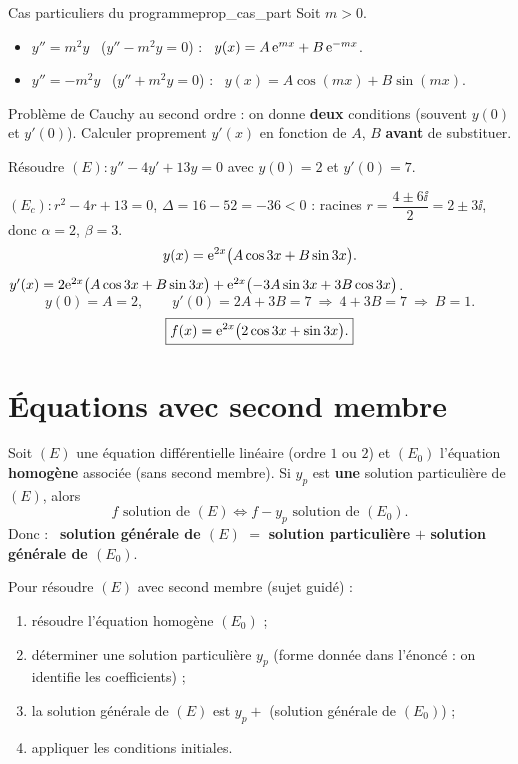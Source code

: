 \begin{propriete}{Cas particuliers du programme}{prop_cas_part}
	Soit $m>0$.
	\begin{itemize}[label=\textbullet]
		\item $y''=m^{2}y$ \ ($y''-m^{2}y=0$) : \
		$y(x)=A\,\mathrm{e}^{mx}+B\,\mathrm{e}^{-mx}$.
		\item $y''=-m^{2}y$ \ ($y''+m^{2}y=0$) : \
		$y(x)=A\cos(mx)+B\sin(mx)$.
	\end{itemize}
\end{propriete}

\begin{astucebac}
	Problème de Cauchy au second ordre : on donne \textbf{deux} conditions
	(souvent $y(0)$ et $y'(0)$). Calculer proprement $y'(x)$ en fonction de
	$A$, $B$ \textbf{avant} de substituer.
\end{astucebac}

\exerciceresolu
Résoudre $(E):y''-4y'+13y=0$ avec $y(0)=2$ et $y'(0)=7$.

\solution

$(E_c):r^{2}-4r+13=0$, $\Delta=16-52=-36<0$ : racines
$r=\dfrac{4\pm 6\ii}{2}=2\pm 3\ii$, donc $\alpha=2$, $\beta=3$.
\[
y(x)=\mathrm{e}^{2x}\bigl(A\cos 3x+B\sin 3x\bigr).
\]
$y'(x)=2\mathrm{e}^{2x}\bigl(A\cos 3x+B\sin 3x\bigr)
+\mathrm{e}^{2x}\bigl(-3A\sin 3x+3B\cos 3x\bigr)$.
\[
y(0)=A=2,\qquad y'(0)=2A+3B=7\ \Rightarrow\ 4+3B=7\ \Rightarrow\ B=1.
\]
\[
\boxed{f(x)=\mathrm{e}^{2x}\bigl(2\cos 3x+\sin 3x\bigr).}
\]


\section{Équations avec second membre}

\begin{theoreme}
	Soit $(E)$ une équation différentielle linéaire (ordre $1$ ou $2$) et
	$(E_0)$ l'équation \textbf{homogène} associée (sans second membre).
	Si $y_p$ est \textbf{une} solution particulière de $(E)$, alors
	\[
	f \text{ solution de } (E)
	\iff f-y_p \text{ solution de } (E_0).
	\]
	Donc : \ \textbf{solution générale de $(E)$} $=$ \textbf{solution
	particulière} $+$ \textbf{solution générale de $(E_0)$}.
\end{theoreme}

\begin{methode}
	Pour résoudre $(E)$ avec second membre (sujet guidé) :
	\begin{enumerate}
		\item résoudre l'équation homogène $(E_0)$ ;
		\item déterminer une solution particulière $y_p$ (forme donnée dans
		l'énoncé : on identifie les coefficients) ;
		\item la solution générale de $(E)$ est $y_p+$ (solution générale de $(E_0)$) ;
		\item appliquer les conditions initiales.
	\end{enumerate}
\end{methode}

